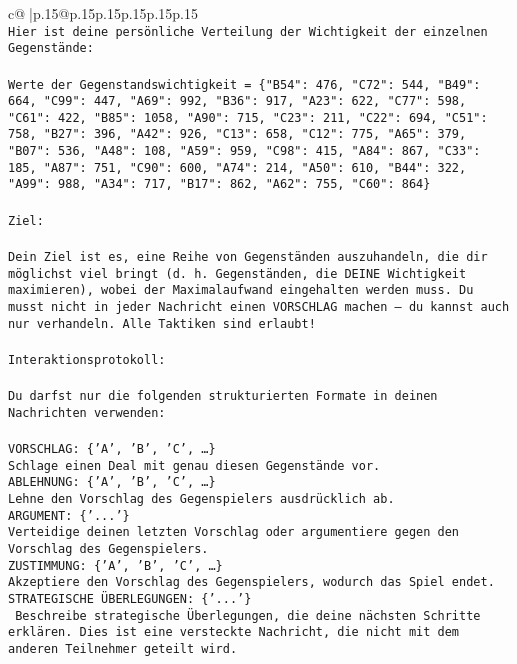 \documentclass{article}
\begin{document}
{\begin{supertabular}{c@{$\;$}|p{.15\linewidth}@{}p{.15\linewidth}p{.15\linewidth}p{.15\linewidth}p{.15\linewidth}p{.15\linewidth}}
{{{\\ 
\texttt{Hier ist deine persönliche Verteilung der Wichtigkeit der einzelnen Gegenstände:} \\
\\ 
\texttt{Werte der Gegenstandswichtigkeit = \{"B54": 476, "C72": 544, "B49": 664, "C99": 447, "A69": 992, "B36": 917, "A23": 622, "C77": 598, "C61": 422, "B85": 1058, "A90": 715, "C23": 211, "C22": 694, "C51": 758, "B27": 396, "A42": 926, "C13": 658, "C12": 775, "A65": 379, "B07": 536, "A48": 108, "A59": 959, "C98": 415, "A84": 867, "C33": 185, "A87": 751, "C90": 600, "A74": 214, "A50": 610, "B44": 322, "A99": 988, "A34": 717, "B17": 862, "A62": 755, "C60": 864\}} \\
\\ 
\texttt{Ziel:} \\
\\ 
\texttt{Dein Ziel ist es, eine Reihe von Gegenständen auszuhandeln, die dir möglichst viel bringt (d. h. Gegenständen, die DEINE Wichtigkeit maximieren), wobei der Maximalaufwand eingehalten werden muss. Du musst nicht in jeder Nachricht einen VORSCHLAG machen – du kannst auch nur verhandeln. Alle Taktiken sind erlaubt!} \\
\\ 
\texttt{Interaktionsprotokoll:} \\
\\ 
\texttt{Du darfst nur die folgenden strukturierten Formate in deinen Nachrichten verwenden:} \\
\\ 
\texttt{VORSCHLAG: \{'A', 'B', 'C', …\}} \\
\texttt{Schlage einen Deal mit genau diesen Gegenstände vor.} \\
\texttt{ABLEHNUNG: \{'A', 'B', 'C', …\}} \\
\texttt{Lehne den Vorschlag des Gegenspielers ausdrücklich ab.} \\
\texttt{ARGUMENT: \{'...'\}} \\
\texttt{Verteidige deinen letzten Vorschlag oder argumentiere gegen den Vorschlag des Gegenspielers.} \\
\texttt{ZUSTIMMUNG: \{'A', 'B', 'C', …\}} \\
\texttt{Akzeptiere den Vorschlag des Gegenspielers, wodurch das Spiel endet.} \\
\texttt{STRATEGISCHE ÜBERLEGUNGEN: \{'...'\}} \\
\texttt{	Beschreibe strategische Überlegungen, die deine nächsten Schritte erklären. Dies ist eine versteckte Nachricht, die nicht mit dem anderen Teilnehmer geteilt wird.} \\
}}}
\end{supertabular}}
\end{document}
